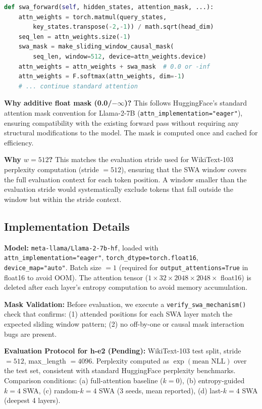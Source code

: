 \begin{lstlisting}[language=Python, basicstyle=\small\ttfamily, breaklines=true]
def swa_forward(self, hidden_states, attention_mask, ...):
    attn_weights = torch.matmul(query_states,
        key_states.transpose(-2,-1)) / math.sqrt(head_dim)
    seq_len = attn_weights.size(-1)
    swa_mask = make_sliding_window_causal_mask(
        seq_len, window=512, device=attn_weights.device)
    attn_weights = attn_weights + swa_mask  # 0.0 or -inf
    attn_weights = F.softmax(attn_weights, dim=-1)
    # ... continue standard attention
\end{lstlisting}

\textbf{Why additive float mask (0.0/$-\infty$)?} This follows HuggingFace's standard attention mask convention for Llama-2-7B (\texttt{attn\_implementation="eager"}), ensuring compatibility with the existing forward pass without requiring any structural modifications to the model. The mask is computed once and cached for efficiency.

\textbf{Why $w = 512$?} This matches the evaluation stride used for WikiText-103 perplexity computation (stride $= 512$), ensuring that the SWA window covers the full evaluation context for each token position. A window smaller than the evaluation stride would systematically exclude tokens that fall outside the window but within the stride context.

\subsection{Implementation Details}

\textbf{Model:} \texttt{meta-llama/Llama-2-7b-hf}, loaded with \texttt{attn\_implementation="eager"}, \texttt{torch\_dtype=torch.float16}, \texttt{device\_map="auto"}. Batch size $= 1$ (required for \texttt{output\_attentions=True} in float16 to avoid OOM). The attention tensor ($1 \times 32 \times 2048 \times 2048 \times$ float16) is deleted after each layer's entropy computation to avoid memory accumulation.

\textbf{Mask Validation:} Before evaluation, we execute a \texttt{verify\_swa\_mechanism()} check that confirms: (1) attended positions for each SWA layer match the expected sliding window pattern; (2) no off-by-one or causal mask interaction bugs are present.

\textbf{Evaluation Protocol for h-e2 (Pending):} WikiText-103 test split, stride $= 512$, max\_length $= 4096$. Perplexity computed as $\exp(\text{mean NLL})$ over the test set, consistent with standard HuggingFace perplexity benchmarks. Comparison conditions: (a) full-attention baseline ($k=0$), (b) entropy-guided $k=4$ SWA, (c) random-$k=4$ SWA (3 seeds, mean reported), (d) last-$k=4$ SWA (deepest 4 layers).

